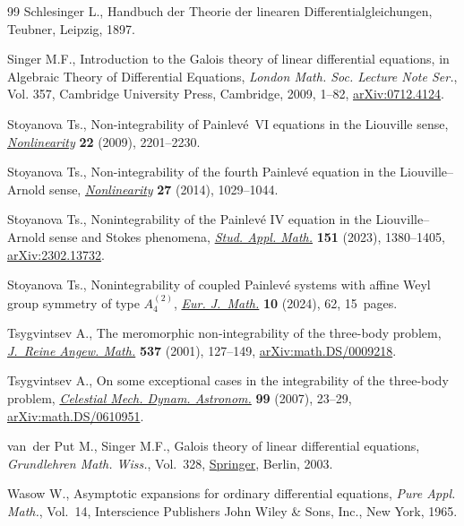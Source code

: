 \documentclass[pdftex]{sigma}
\numberwithin{equation}{section}
\begin{document}
\begin{thebibliography}{99}
Schlesinger L., Handbuch der {T}heorie der linearen {D}ifferentialgleichungen,
 Teubner, Leipzig, 1897.

Singer M.F., Introduction to the {G}alois theory of linear differential
 equations, in Algebraic Theory of Differential Equations, \textit{London
 Math. Soc. Lecture Note Ser.}, Vol. 357, Cambridge University Press,
 Cambridge, 2009, 1--82, \href{https://arxiv.org/abs/0712.4124}{arXiv:0712.4124}.

Stoyanova Ts., Non-integrability of {P}ainlev\'e~{VI} equations in the
 {L}iouville sense, \href{https://doi.org/10.1088/0951-7715/22/9/008}{\textit{Nonlinearity}} \textbf{22} (2009), 2201--2230.

Stoyanova Ts., Non-integrability of the fourth {P}ainlev\'e equation in the
 {L}iouville--{A}rnold sense, \href{https://doi.org/10.1088/0951-7715/27/5/1029}{\textit{Nonlinearity}} \textbf{27} (2014),
 1029--1044.

Stoyanova Ts., Nonintegrability of the {P}ainlev\'e {IV} equation in the
 {L}iouville--{A}rnold sense and {S}tokes phenomena, \href{https://doi.org/10.1111/sapm.12629}{\textit{Stud. Appl.
 Math.}} \textbf{151} (2023), 1380--1405, \href{https://arxiv.org/abs/2302.13732}{arXiv:2302.13732}.

Stoyanova Ts., Nonintegrability of coupled {P}ainlev\'e systems with affine
 {W}eyl group symmetry of type {$A_4^{(2)}$}, \href{https://doi.org/10.1007/s40879-024-00781-x}{\textit{Eur. J.~Math.}}
 \textbf{10} (2024), 62, 15~pages.

Tsygvintsev A., The meromorphic non-integrability of the three-body problem,
 \href{https://doi.org/10.1515/crll.2001.061}{\textit{J.~Reine Angew. Math.}} \textbf{537} (2001), 127--149,
 \href{https://arxiv.org/abs/math.DS/0009218}{arXiv:math.DS/0009218}.

Tsygvintsev A., On some exceptional cases in the integrability of the
 three-body problem, \href{https://doi.org/10.1007/s10569-007-9086-5}{\textit{Celestial Mech. Dynam. Astronom.}} \textbf{99}
 (2007), 23--29, \href{https://arxiv.org/abs/math.DS/0610951}{arXiv:math.DS/0610951}.

van~der Put M., Singer M.F., Galois theory of linear differential equations,
 \textit{Grundlehren Math. Wiss.}, Vol.~328, \href{https://doi.org/10.1007/978-3-642-55750-7}{Springer}, Berlin, 2003.

Wasow W., Asymptotic expansions for ordinary differential equations,
 \textit{Pure Appl. Math.}, Vol.~14, Interscience Publishers John Wiley \&
 Sons, Inc., New York, 1965.

\end{thebibliography}\LastPageEnding
\end{document}
